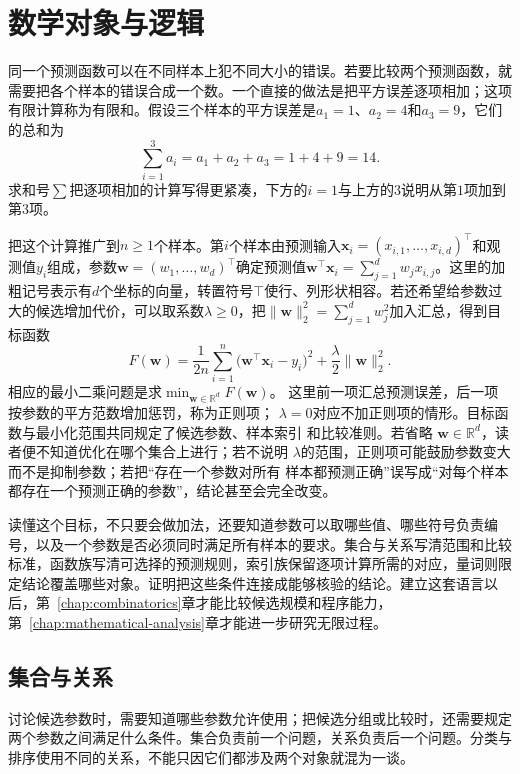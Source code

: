 \chapter{数学对象与逻辑}
\label{chap:sets-functions-and-proofs}

同一个预测函数可以在不同样本上犯不同大小的错误。若要比较两个预测函数，就需要把各个样本的错误合成一个数。一个直接的做法是把平方误差逐项相加；这项有限计算称为有限和。假设三个样本的平方误差是$a_1=1$、$a_2=4$和$a_3=9$，它们的总和为
\[
  \sum_{i=1}^{3}a_i=a_1+a_2+a_3=1+4+9=14.
\]
求和号$\sum$把逐项相加的计算写得更紧凑，下方的$i=1$与上方的$3$说明从第$1$项加到
第$3$项。

把这个计算推广到$n\geq1$个样本。第$i$个样本由预测输入$\bm{x}_i=(x_{i,1},\ldots,x_{i,d})^{\top}$和观测值$y_i$组成，参数$\bm w=(w_1,\ldots,w_d)^{\top}$确定预测值$\bm w^{\top}\bm x_i=\sum_{j=1}^d w_jx_{i,j}$。这里的加粗记号表示有$d$个坐标的向量，转置符号$\top$使行、列形状相容。若还希望给参数过大的候选增加代价，可以取系数$\lambda\geq0$，把$\lVert\bm w\rVert_2^2=\sum_{j=1}^dw_j^2$加入汇总，得到目标函数
\begin{equation}
  F(\bm{w})
  =
  \frac{1}{2n}\sum_{i=1}^{n}
  \bigl(\bm{w}^{\top}\bm{x}_i-y_i\bigr)^2
  +
  \frac{\lambda}{2}\lVert\bm{w}\rVert_2^2.
  \label{eq:prelim-regularized-least-squares}
\end{equation}
相应的最小二乘问题是求$\min_{\bm{w}\in\mathbb{R}^d}F(\bm{w})$。
这里前一项汇总预测误差，后一项按参数的平方范数增加惩罚，称为正则项；
$\lambda=0$对应不加正则项的情形。目标函数与最小化范围共同规定了候选参数、样本索引
和比较准则。若省略
$\bm{w}\in\mathbb{R}^d$，读者便不知道优化在哪个集合上进行；若不说明
$\lambda$的范围，正则项可能鼓励参数变大而不是抑制参数；若把“存在一个参数对所有
样本都预测正确”误写成“对每个样本都存在一个预测正确的参数”，结论甚至会完全改变。

读懂这个目标，不只要会做加法，还要知道参数可以取哪些值、哪些符号负责编号，以及一个参数是否必须同时满足所有样本的要求。集合与关系写清范围和比较标准，函数族写清可选择的预测规则，索引族保留逐项计算所需的对应，量词则限定结论覆盖哪些对象。证明把这些条件连接成能够核验的结论。建立这套语言以后，第~\ref{chap:combinatorics}章才能比较候选规模和程序能力，第~\ref{chap:mathematical-analysis}章才能进一步研究无限过程。

\section{集合与关系}
\label{sec:prelim-sets-relations-functions}

讨论候选参数时，需要知道哪些参数允许使用；把候选分组或比较时，还需要规定两个参数之间满足什么条件。集合负责前一个问题，关系负责后一个问题。分类与排序使用不同的关系，不能只因它们都涉及两个对象就混为一谈。

